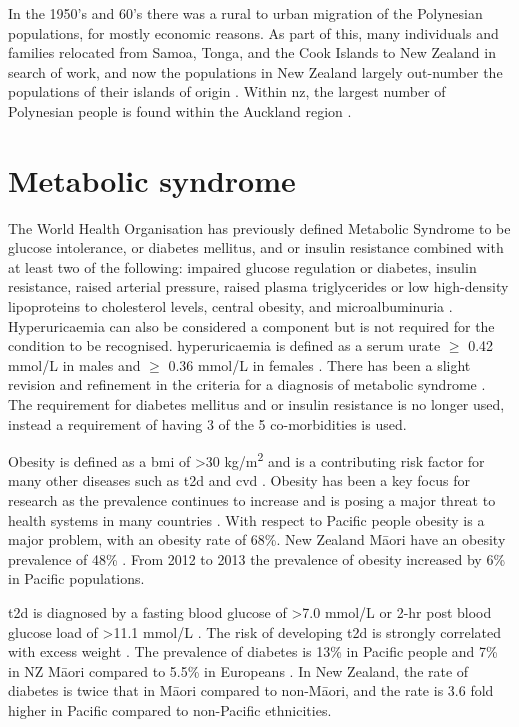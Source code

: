 \documentclass[]{report}
\newcommand{\tex}[1]{#1}
\begin{document}
In the 1950's and 60's there was a rural to urban migration of the
Polynesian populations, for mostly economic reasons. As part of this,
many individuals and families relocated from Samoa, Tonga, and the Cook
Islands to New Zealand in search of work, and now the populations in New
Zealand largely out-number the populations of their islands of origin
\citep{MatisooSmith2012highway}. Within \glsdesc{nz}, the largest number
of Polynesian people is found within the Auckland region
\citep{Barcham2009}.

\section{Metabolic syndrome}\label{metabolic-syndrome}

The World Health Organisation has previously defined Metabolic Syndrome
to be glucose intolerance, or diabetes mellitus, and or insulin
resistance combined with at least two of the following: impaired glucose
regulation or diabetes, insulin resistance, raised arterial pressure,
raised plasma triglycerides or low high-density lipoproteins to
cholesterol levels, central obesity, and microalbuminuria
\citep{Alberti1998}. Hyperuricaemia can also be considered a component
but is not required for the condition to be recognised. hyperuricaemia
is defined as a serum urate \(\geq\) 0.42 mmol/L in males and \(\geq\)
0.36 mmol/L in females \citep{Choi2007b}. There has been a slight
revision and refinement in the criteria for a diagnosis of metabolic
syndrome \citep{Alberti2009}. The requirement for diabetes mellitus and
or insulin resistance is no longer used, instead a requirement of having
3 of the 5 co-morbidities is used.

Obesity is defined as a \gls{bmi} of \textgreater{}30
kg/m\textsuperscript{2} and is a contributing risk factor for many other
diseases such as \gls{t2d} and \gls{cvd} \citep{Haslam2005}. Obesity has
been a key focus for research as the prevalence continues to increase
and is posing a major threat to health systems in many countries
\citep{Wang2011}. With respect to Pacific people obesity is a major
problem, with an obesity rate of 68\%. New Zealand M\tex{\={a}}ori have
an obesity prevalence of 48\% \citep{Health2013}. From 2012 to 2013 the
prevalence of obesity increased by 6\% in Pacific populations.

\Gls{t2d} is diagnosed by a fasting blood glucose of \textgreater{}7.0
mmol/L or 2-hr post blood glucose load of \textgreater{}11.1 mmol/L
\citep{Alberti1998}. The risk of developing \gls{t2d} is strongly
correlated with excess weight \citep{Rana2007}. The prevalence of
diabetes is 13\% in Pacific people and 7\% in NZ M\tex{\={a}}ori
\citep{Health2013} compared to 5.5\% in Europeans \citep{Winnard2013}.
In New Zealand, the rate of diabetes is twice that in M\tex{\={a}}ori
compared to non-M\tex{\={a}}ori, and the rate is 3.6 fold higher in
Pacific compared to non-Pacific ethnicities.
\end{document}
